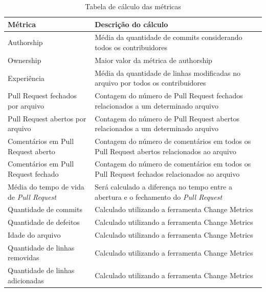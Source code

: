 \begin{table}[H]
\centering
\caption{Tabela de cálculo das métricas}
\label{cálculometricas}
\begin{tabular}{|p{4cm}|p{12cm}|}
\hline
Métrica                             & Descrição do cálculo                                                                        \\ \hline
Authorship                          & Média da quantidade de commits considerando todos os contribuidores                         \\ \hline
Ownership                           & Maior valor da métrica de authorship                                                        \\ \hline
Experiência                         & Média da quantidade de linhas modificadas no arquivo por todos os contribuidores            \\ \hline
Pull Request fechados por arquivo   & Contagem do número de Pull Request fechados relacionados a um determinado arquivo           \\ \hline
Pull Request abertos por arquivo    & Contagem do número de Pull Request abertos relacionados a um determinado arquivo            \\ \hline
Comentários em Pull Request aberto  & Contagem do número de comentários em todos os Pull Request abertos relacionados ao arquivo  \\ \hline
Comentários em Pull Request fechado & Contagem do número de comentários em todos os Pull Request fechados relacionados ao arquivo \\ \hline
Média do tempo de vida de \textit{Pull Request} & Será calculado a diferença no tempo entre a abertura e o fechamento do \textit{Pull Request} \\ \hline
Quantidade de commits               & Calculado utilizando a ferramenta Change Metrics                                        \\ \hline
Quantidade de defeitos              & Calculado utilizando a ferramenta Change Metrics                                            \\ \hline
Idade do arquivo                    & Calculado utilizando a ferramenta Change Metrics                                            \\ \hline
Quantidade de linhas removidas      & Calculado utilizando a ferramenta Change Metrics                                            \\ \hline
Quantidade de linhas adicionadas    & Calculado utilizando a ferramenta Change Metrics                                            \\ \hline

\end{tabular}
\end{table}
